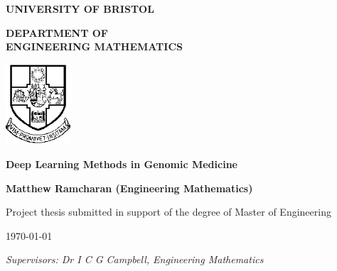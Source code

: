 \begin{titlepage}

\begin{center}
    \textbf{\LARGE UNIVERSITY OF BRISTOL}
    
    \vspace{3em}
    
    \textbf{\Huge DEPARTMENT OF \\ \vspace{0.5em} ENGINEERING MATHEMATICS}
    
\end{center}
\vspace{3cm}

\center
\includegraphics[width=0.18\textwidth]{Fig/Misc/UOBLogo.png}\par\vspace{1cm}

\vspace{2.5cm}

{ \huge \bfseries Deep Learning Methods in Genomic Medicine
}\\

\vspace{3cm}

{ \large \bfseries Matthew Ramcharan (Engineering Mathematics)
}\\

\vspace{2cm}

{\large Project thesis submitted in support of the degree of Master of Engineering}

\vspace{1cm}

\today

\vspace{0.5em}


\textit{Supervisors: Dr I C G Campbell,  Engineering Mathematics}

\end{titlepage}
